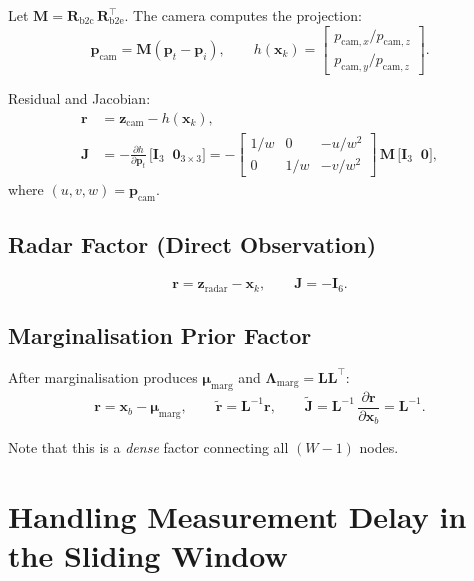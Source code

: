 \documentclass[11pt,a4paper]{article}
\newcommand{\bx}{\bm{x}}
\newcommand{\bz}{\bm{z}}
\newcommand{\br}{\bm{r}}
\newcommand{\bp}{\bm{p}}
\newcommand{\bJ}{\bm{J}}
\newcommand{\bI}{\bm{I}}
\newcommand{\bR}{\bm{R}}
\newcommand{\bLambda}{\bm{\Lambda}}
\theoremstyle{definition}
\theoremstyle{plain}
\begin{document}
Let $\bm{M} = \bR_{\text{b2c}}\,\bR_{\text{b2e}}^\top$.  The camera
computes the projection:
\begin{equation}
  \bp_{\text{cam}} = \bm{M}(\bp_t - \bp_i), \qquad
  h(\bx_k) = \begin{bmatrix} p_{\text{cam},x}/p_{\text{cam},z} \\
                               p_{\text{cam},y}/p_{\text{cam},z}
              \end{bmatrix}.
\end{equation}

Residual and Jacobian:
\begin{align}
  \br &= \bz_{\text{cam}} - h(\bx_k), \\
  \bJ &= -\frac{\partial h}{\partial \bp_t}\,\big[\bI_3 \;\; \bm{0}_{3\times3}\big]
       = -\begin{bmatrix}
           1/w & 0 & -u/w^2 \\
           0 & 1/w & -v/w^2
         \end{bmatrix}\,\bm{M}\,\big[\bI_3 \;\; \bm{0}\big],
\end{align}
where $(u, v, w) = \bp_{\text{cam}}$.

\subsection{Radar Factor (Direct Observation)}

\begin{equation}
  \br = \bz_{\text{radar}} - \bx_k, \qquad
  \bJ = -\bI_6.
\end{equation}

\subsection{Marginalisation Prior Factor}

After marginalisation produces $\bm{\mu}_{\text{marg}}$ and
$\bLambda_{\text{marg}} = \bm{L}\bm{L}^\top$:
\begin{equation}
  \br = \bx_b - \bm{\mu}_{\text{marg}}, \qquad
  \tilde{\br} = \bm{L}^{-1}\br, \qquad
  \tilde{\bJ} = \bm{L}^{-1}\,\frac{\partial \br}{\partial \bx_b} = \bm{L}^{-1}.
  \label{eq:marg_factor}
\end{equation}

Note that this is a \emph{dense} factor connecting all $(W-1)$ nodes.

\section{Handling Measurement Delay in the Sliding Window}
\label{sec:delay}
\end{document}
